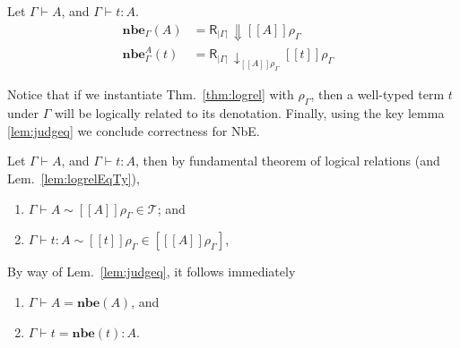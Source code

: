 \documentclass{LMCS}
\theoremstyle{plain}\newtheorem{satz}[thm]{Satz}
\newcommand{\LONGVERSION}[1]{#1}
\newcommand{\SHORTVERSION}[1]{}
\newcommand{\dtype}[2]{#1\vdash#2}
\newcommand{\dterm}[3]{#1\vdash#3:#2}
\newcommand{\deqtype}[3]{#1\vdash#2=#3}
\newcommand{\deqterm}[4]{#1\vdash#3=#4:#2}
\newcommand{\Da}[1]{\mathop{\Downarrow} #1}
\newcommand{\da}[2]{\mathop{\downarrow}\nolimits_{#1}{#2}}
\newcommand{\reifyC}[2]{\mathsf{R}_{|#1|}\,#2}
\newcommand{\perT}{\mathcal{T}}
\newcommand{\semc}[1]{[\![#1]\!]}
\newcommand{\rel}{\sim}
\newcommand{\nbe}[1]{\mathbf{nbe}(#1)}
\newcommand{\nbety}[2]{\mathbf{nbe}_{#1}(#2)}
\newcommand{\nbetm}[3]{\mathbf{nbe}_{#1}^{#2}(#3)}
\newcommand{\LONGVERSION}[1]{}
\newcommand{\SHORTVERSION}[1]{#1}
\newcommand{\LONGSHORT}[2]{\LONGVERSION{#1}\SHORTVERSION{#2}}
\begin{document}
\begin{defi} 
  \label{def:nbe-alg}
  Let $\dtype{\Gamma}{A}$, and $\dterm{\Gamma}{A}{t}$.
  \begin{align*}
    \nbety{\Gamma}{A} &= \reifyC{\Gamma}{\Da{\semc{A}{\rho_\Gamma}}} &\\
    \nbetm{\Gamma}{A}{t} &= \reifyC{\Gamma}{\da{\semc{A}{\rho_\Gamma}}{\semc{t}\rho_\Gamma}} &
  \end{align*}
\end{defi}\medskip

\LONGSHORT{


  \noindent Notice that if we instantiate Thm.~\ref{thm:logrel} with
  $\rho_\Gamma$, then a well-typed term $t$ under $\Gamma$ will be
  logically related to its denotation. Finally, using the key lemma
  \ref{lem:judgeq} we conclude correctness for NbE.

  \begin{cor}
    Let $\dtype{\Gamma}{A}$, and $\dterm{\Gamma}{A}{t}$, then by
    fundamental theorem of logical relations (and Lem.~\ref{lem:logrelEqTy}),
    \begin{enumerate}[\em(1)]
    \item $\dtype{\Gamma}{A}\rel \semc{A}\rho_\Gamma \in
      \perT$; and
    \item $\dterm{\Gamma}{A}{t}\rel \semc{t}\rho_\Gamma \in
      [\semc{A}\rho_\Gamma]$,
    \end{enumerate}
  \end{cor}

  \begin{cor}[Soundness of NbE]\label{rem:nbe-eq}
    By way of Lem.~\ref{lem:judgeq}, it follows immediately
    \begin{enumerate}[\em(1)]
    \item $\deqtype{\Gamma}{A}{\nbe{A}}$, and
    \item $\deqterm{\Gamma}{A}{t}{\nbe{t}}$.
    \end{enumerate}
  \end{cor}

}{ The first point of soundness is a direct consequence of
  Thm.~\ref{thm:logrel} and Lem.~\ref{lem:logrelEqTy}; and the second
  point is obtained using Lem.~\ref{lem:judgeq}.
  \begin{cor}[Soundness of NbE]
      \label{rem:nbe-eq}
      Let $\dtype{\Gamma}{A}$, and $\dterm{\Gamma}{A}{t}$, then
      \begin{enumerate}
\item $\dtype{\Gamma}{A}\rel \semc{A}\rho_\Gamma \in \perT$, and
        $\dterm{\Gamma}{A}{t}\rel \semc{t}\rho_\Gamma \in
        [\semc{A}\rho_\Gamma]$; and
      \item $\deqtype{\Gamma}{A}{\nbe{A}}$, and
        $\deqterm{\Gamma}{A}{t}{\nbe{t}}$.
      \end{enumerate}
  \end{cor}
}
\end{document}
